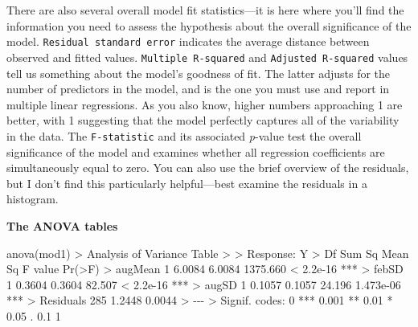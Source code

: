 \documentclass[
  letterpaper,
]{book}
\newenvironment{Shaded}{\begin{snugshade}}{\end{snugshade}}
\newcommand{\DecValTok}[1]{\textcolor[rgb]{0.68,0.00,0.00}{#1}}
\newcommand{\ErrorTok}[1]{\textcolor[rgb]{0.68,0.00,0.00}{#1}}
\newcommand{\FloatTok}[1]{\textcolor[rgb]{0.68,0.00,0.00}{#1}}
\newcommand{\FunctionTok}[1]{\textcolor[rgb]{0.28,0.35,0.67}{#1}}
\newcommand{\NormalTok}[1]{\textcolor[rgb]{0.00,0.23,0.31}{#1}}
\newcommand{\SpecialCharTok}[1]{\textcolor[rgb]{0.37,0.37,0.37}{#1}}
\newcommand{\StringTok}[1]{\textcolor[rgb]{0.13,0.47,0.30}{#1}}
\begin{document}
There are also several overall model fit statistics---it is here where
you'll find the information you need to assess the hypothesis about the
overall significance of the model. \texttt{Residual\ standard\ error}
indicates the average distance between observed and fitted values.
\texttt{Multiple\ R-squared} and \texttt{Adjusted\ R-squared} values
tell us something about the model's goodness of fit. The latter adjusts
for the number of predictors in the model, and is the one you must use
and report in multiple linear regressions. As you also know, higher
numbers approaching 1 are better, with 1 suggesting that the model
perfectly captures all of the variability in the data. The
\texttt{F-statistic} and its associated \emph{p}-value test the overall
significance of the model and examines whether all regression
coefficients are simultaneously equal to zero. You can also use the
brief overview of the residuals, but I don't find this particularly
helpful---best examine the residuals in a histogram.

\textbf{The ANOVA tables}

\begin{Shaded}
\begin{Highlighting}[]
\FunctionTok{anova}\NormalTok{(mod1)}
\SpecialCharTok{\textgreater{}}\NormalTok{ Analysis of Variance Table}
\SpecialCharTok{\textgreater{}} 
\ErrorTok{\textgreater{}}\NormalTok{ Response}\SpecialCharTok{:}\NormalTok{ Y}
\SpecialCharTok{\textgreater{}}\NormalTok{            Df Sum Sq Mean Sq  F value    }\FunctionTok{Pr}\NormalTok{(}\SpecialCharTok{\textgreater{}}\NormalTok{F)    }
\SpecialCharTok{\textgreater{}}\NormalTok{ augMean     }\DecValTok{1} \FloatTok{6.0084}  \FloatTok{6.0084} \FloatTok{1375.660} \SpecialCharTok{\textless{}} \FloatTok{2.2e{-}16} \SpecialCharTok{**}\ErrorTok{*}
\ErrorTok{\textgreater{}}\NormalTok{ febSD       }\DecValTok{1} \FloatTok{0.3604}  \FloatTok{0.3604}   \FloatTok{82.507} \SpecialCharTok{\textless{}} \FloatTok{2.2e{-}16} \SpecialCharTok{**}\ErrorTok{*}
\ErrorTok{\textgreater{}}\NormalTok{ augSD       }\DecValTok{1} \FloatTok{0.1057}  \FloatTok{0.1057}   \FloatTok{24.196} \FloatTok{1.473e{-}06} \SpecialCharTok{**}\ErrorTok{*}
\ErrorTok{\textgreater{}}\NormalTok{ Residuals }\DecValTok{285} \FloatTok{1.2448}  \FloatTok{0.0044}                       
\SpecialCharTok{\textgreater{}} \SpecialCharTok{{-}{-}{-}}
\ErrorTok{\textgreater{}}\NormalTok{ Signif. codes}\SpecialCharTok{:}  \DecValTok{0} \StringTok{\textquotesingle{}***\textquotesingle{}} \FloatTok{0.001} \StringTok{\textquotesingle{}**\textquotesingle{}} \FloatTok{0.01} \StringTok{\textquotesingle{}*\textquotesingle{}} \FloatTok{0.05} \StringTok{\textquotesingle{}.\textquotesingle{}} \FloatTok{0.1} \StringTok{\textquotesingle{} \textquotesingle{}} \DecValTok{1}
\end{Highlighting}
\end{Shaded}
\end{document}

